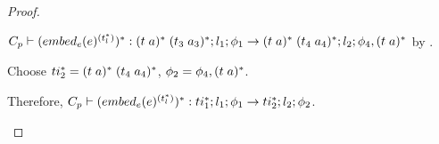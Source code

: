 \begin{proof}
\begin{enumerate}
        $C_p \vdash (\embed[e]{e}^{(t_l^{*})})^{*} : \ti{t}{a}^{*}\; \ti{t_3}{a_3}^{*};l_1;\phi_1 \rightarrow \ti{t}{a}^{*}\; \ti{t_4}{a_4}^{*};l_2;\phi_4,\ti{t}{a}^{*}$ by .

        Choose $ti_2^{*} = \ti{t}{a}^{*}\; \ti{t_4}{a_4}^{*}$, $\phi_2 = \phi_4,\ti{t}{a}^{*}$.

        Therefore, $C_p \vdash (\embed[e]{e}^{(t_l^{*})})^{*} : ti_1^{*};l_1;\phi_1 \rightarrow ti_2^{*};l_2;\phi_2$.

    \end{enumerate}
\end{proof}

